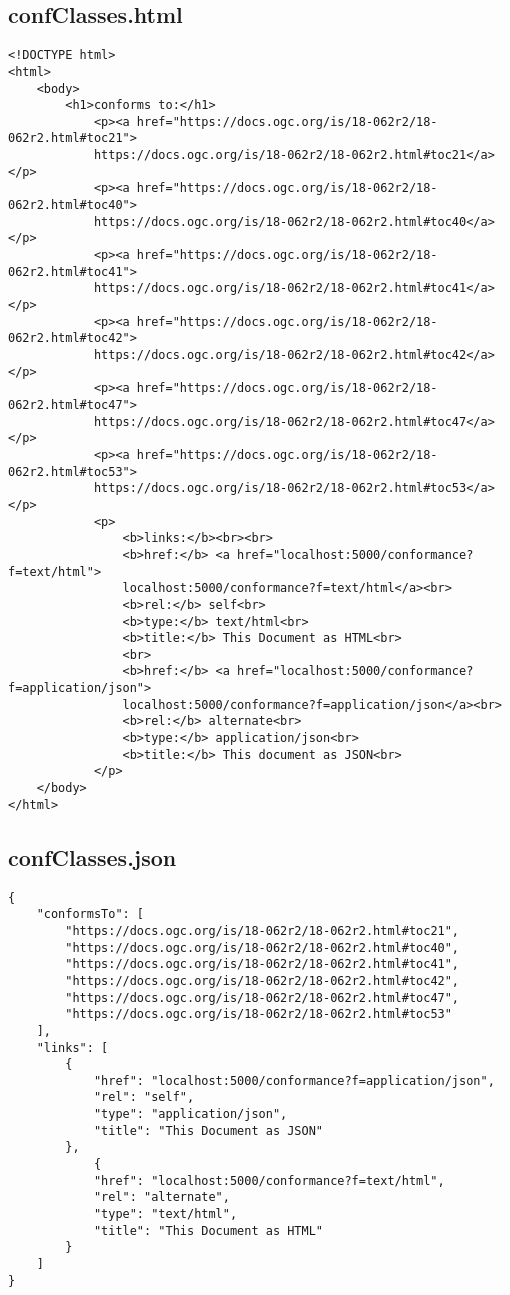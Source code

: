 \subsection{confClasses.html}
\begin{lstlisting}[caption={confClasses.html}, style = HTML]
<!DOCTYPE html>
<html>
    <body>
        <h1>conforms to:</h1>
            <p><a href="https://docs.ogc.org/is/18-062r2/18-062r2.html#toc21">
            https://docs.ogc.org/is/18-062r2/18-062r2.html#toc21</a></p>
            <p><a href="https://docs.ogc.org/is/18-062r2/18-062r2.html#toc40">
            https://docs.ogc.org/is/18-062r2/18-062r2.html#toc40</a></p>
            <p><a href="https://docs.ogc.org/is/18-062r2/18-062r2.html#toc41">
            https://docs.ogc.org/is/18-062r2/18-062r2.html#toc41</a></p>
            <p><a href="https://docs.ogc.org/is/18-062r2/18-062r2.html#toc42">
            https://docs.ogc.org/is/18-062r2/18-062r2.html#toc42</a></p>
			<p><a href="https://docs.ogc.org/is/18-062r2/18-062r2.html#toc47">
            https://docs.ogc.org/is/18-062r2/18-062r2.html#toc47</a></p>
			<p><a href="https://docs.ogc.org/is/18-062r2/18-062r2.html#toc53">
            https://docs.ogc.org/is/18-062r2/18-062r2.html#toc53</a></p>
            <p>
                <b>links:</b><br><br>
                <b>href:</b> <a href="localhost:5000/conformance?f=text/html">
                localhost:5000/conformance?f=text/html</a><br>
                <b>rel:</b> self<br>
                <b>type:</b> text/html<br>
                <b>title:</b> This Document as HTML<br>
                <br>
                <b>href:</b> <a href="localhost:5000/conformance?f=application/json">
                localhost:5000/conformance?f=application/json</a><br>
                <b>rel:</b> alternate<br>
                <b>type:</b> application/json<br>
                <b>title:</b> This document as JSON<br>
            </p>
    </body>
</html>
\end{lstlisting}\label{appendixconfClassesHTML}  

\subsection{confClasses.json}
\begin{lstlisting}[caption={confClasses.json}, style = JSON]
{
    "conformsTo": [
        "https://docs.ogc.org/is/18-062r2/18-062r2.html#toc21",
        "https://docs.ogc.org/is/18-062r2/18-062r2.html#toc40",
        "https://docs.ogc.org/is/18-062r2/18-062r2.html#toc41",
        "https://docs.ogc.org/is/18-062r2/18-062r2.html#toc42",
        "https://docs.ogc.org/is/18-062r2/18-062r2.html#toc47",
        "https://docs.ogc.org/is/18-062r2/18-062r2.html#toc53"
    ],
    "links": [
        {
            "href": "localhost:5000/conformance?f=application/json",
            "rel": "self",
            "type": "application/json",
            "title": "This Document as JSON"
        },
            {
            "href": "localhost:5000/conformance?f=text/html",
            "rel": "alternate",
            "type": "text/html",
            "title": "This Document as HTML"
        }
    ]
}
\end{lstlisting}\label{appendixconfClassesJSON}  

